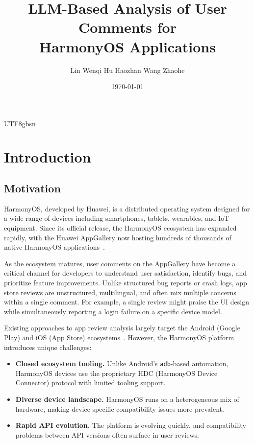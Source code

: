 \documentclass[11pt,a4paper]{article}
\title{\textbf{LLM-Based Analysis of User Comments for\\HarmonyOS Applications}}
\author{
  Lin Wenqi \quad Hu Haozhan \quad Wang Zhaohe
}
\date{\today}
\begin{document}
\begin{CJK*}{UTF8}{gbsn}
\maketitle

\section{Introduction}

\subsection{Motivation}

HarmonyOS, developed by Huawei, is a distributed operating system designed for a wide range of devices including smartphones, tablets, wearables, and IoT equipment. Since its official release, the HarmonyOS ecosystem has expanded rapidly, with the Huawei AppGallery now hosting hundreds of thousands of native HarmonyOS applications~\cite{harmonyos_overview}.

As the ecosystem matures, user comments on the AppGallery have become a critical channel for developers to understand user satisfaction, identify bugs, and prioritize feature improvements. Unlike structured bug reports or crash logs, app store reviews are unstructured, multilingual, and often mix multiple concerns within a single comment. For example, a single review might praise the UI design while simultaneously reporting a login failure on a specific device model.

Existing approaches to app review analysis largely target the Android (Google Play) and iOS (App Store) ecosystems~\cite{pagano13,martin17}. However, the HarmonyOS platform introduces unique challenges:
\begin{itemize}[nosep]
  \item \textbf{Closed ecosystem tooling.} Unlike Android's \texttt{adb}-based automation, HarmonyOS devices use the proprietary HDC (HarmonyOS Device Connector) protocol with limited tooling support.
  \item \textbf{Diverse device landscape.} HarmonyOS runs on a heterogeneous mix of hardware, making device-specific compatibility issues more prevalent.
  \item \textbf{Rapid API evolution.} The platform is evolving quickly, and compatibility problems between API versions often surface in user reviews.
\end{itemize}


\end{CJK*}
\end{document}
